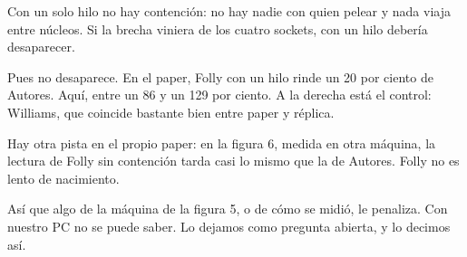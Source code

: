 Con un solo hilo no hay contención: no hay nadie con quien pelear y nada viaja entre núcleos. Si la brecha viniera de los cuatro sockets, con un hilo debería desaparecer.

Pues no desaparece. En el paper, Folly con un hilo rinde un 20 por ciento de Autores. Aquí, entre un 86 y un 129 por ciento. A la derecha está el control: Williams, que coincide bastante bien entre paper y réplica.

Hay otra pista en el propio paper: en la figura 6, medida en otra máquina, la lectura de Folly sin contención tarda casi lo mismo que la de Autores. Folly no es lento de nacimiento.

Así que algo de la máquina de la figura 5, o de cómo se midió, le penaliza. Con nuestro PC no se puede saber. Lo dejamos como pregunta abierta, y lo decimos así.
